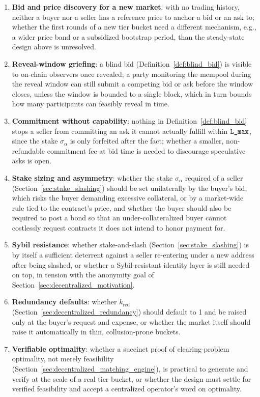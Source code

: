 \begin{enumerate}
  \item \textbf{Bid and price discovery for a new market}: with no trading
    history, neither a buyer nor a seller has a reference price to anchor
    a bid or an ask to; whether the first rounds of a new tier bucket need
    a different mechanism, e.g., a wider price band or a subsidized
    bootstrap period, than the steady-state design above is unresolved.

  \item \textbf{Reveal-window griefing}: a blind bid
    (Definition~\ref{def:blind_bid}) is visible to on-chain observers once
    revealed; a party monitoring the mempool during the reveal window can
    still submit a competing bid or ask before the window closes, unless
    the window is bounded to a single block, which in turn bounds how many
    participants can feasibly reveal in time.

  \item \textbf{Commitment without capability}: nothing in
    Definition~\ref{def:blind_bid} stops a seller from committing an ask
    it cannot actually fulfill within $\textnormal{\texttt{L\_max}}$, since the stake
    $\sigma_\alpha$ is only forfeited after the fact; whether a smaller,
    non-refundable commitment fee at bid time is needed to discourage
    speculative asks is open.

  \item \textbf{Stake sizing and asymmetry}: whether the stake
    $\sigma_\alpha$ required of a seller (Section~\ref{sec:stake_slashing})
    should be set unilaterally by the buyer's bid, which risks the buyer
    demanding excessive collateral, or by a market-wide rule tied to the
    contract's price, and whether the buyer should also be required to
    post a bond so that an under-collateralized buyer cannot costlessly
    request contracts it does not intend to honor payment for.

  \item \textbf{Sybil resistance}: whether stake-and-slash
    (Section~\ref{sec:stake_slashing}) is by itself a sufficient deterrent
    against a seller re-entering under a new address after being slashed,
    or whether a Sybil-resistant identity layer is still needed on top, in
    tension with the anonymity goal of Section~\ref{sec:decentralized_motivation}.

  \item \textbf{Redundancy defaults}: whether $k_{\text{red}}$
    (Section~\ref{sec:decentralized_redundancy}) should default to 1 and
    be raised only at the buyer's request and expense, or whether the
    market itself should raise it automatically in thin, collusion-prone
    buckets.

  \item \textbf{Verifiable optimality}: whether a succinct proof of
    clearing-problem optimality, not merely feasibility
    (Section~\ref{sec:decentralized_matching_engine}), is practical to
    generate and verify at the scale of a real tier bucket, or whether the
    design must settle for verified feasibility and accept a centralized
    operator's word on optimality.
\end{enumerate}
